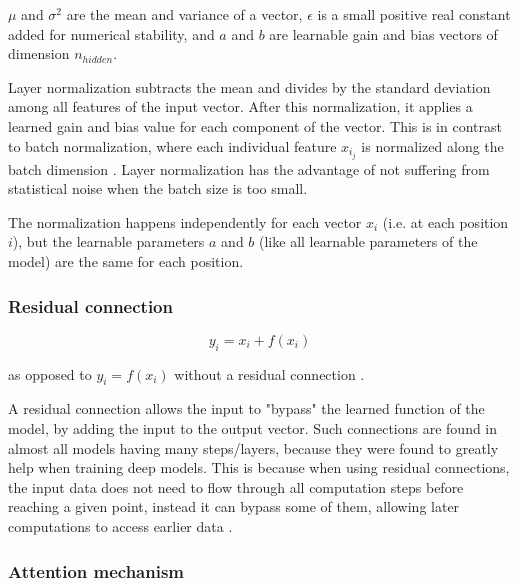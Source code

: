 $\mu$ and $\sigma^2$ are the mean and variance of a vector, $\epsilon$ is a small positive real constant added for numerical stability, and $a$ and $b$ are learnable gain and bias vectors of dimension $n_{hidden}$.

Layer normalization subtracts the mean and divides by the standard deviation among all features of the input vector.
After this normalization, it applies a learned gain and bias value for each component of the vector.
This is in contrast to batch normalization, where each individual feature $x_{i_j}$ is normalized along the batch dimension .
Layer normalization has the advantage of not suffering from statistical noise when the batch size is too small.

The normalization happens independently for each vector $x_i$ (i.e. at each position $i$), but the learnable parameters $a$ and $b$ (like all learnable parameters of the model) are the same for each position.

\subsubsection{Residual connection}

\begin{samepage}

$$y_i = x_i + f(x_i)$$

as opposed to $y_i = f(x_i)$ without a residual connection  \cite{residual}.

A residual connection allows the input to "bypass" the learned function of the model, by adding the input to the output vector.
Such connections are found in almost all models having many steps/layers, because they were found to greatly help when training deep models.
This is because when using residual connections, the input data does not need to flow through all computation steps before reaching a given point, instead it can bypass some of them, allowing later computations to access earlier data .

\end{samepage}

\subsubsection{Attention mechanism}
\label{gpt2_attn}




